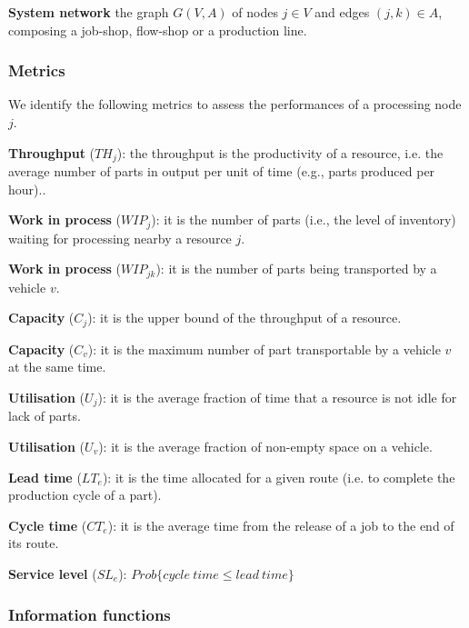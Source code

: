 \textbf{System network} the graph $G(V,A)$ of nodes $j\in V$ and edges $\left(j,k\right)\in A$, composing a job-shop, flow-shop or a production line.

\subsubsection{Metrics}
We identify the following metrics to assess the performances of a processing node $j$.\par

\textbf{Throughput} ($TH_{j}$): the throughput is the productivity of a resource, i.e. the average number of parts in output per unit of time (e.g., parts produced per hour)..\par

\textbf{Work in process} ($WIP_{j}$): it is the number of parts (i.e., the level of inventory) waiting for processing nearby a resource $j$.\par

\textbf{Work in process} ($WIP_{jk}$): it is the number of parts being transported by a vehicle $v$. \par

\textbf{Capacity} ($C_j$): it is the upper bound of the throughput of a resource.\par

\textbf{Capacity} ($C_v$): it is the maximum number of part transportable by a vehicle $v$ at the same time. \par

\textbf{Utilisation} ($U_j$): it is the average fraction of time that a resource is not idle for lack of parts. \par

\textbf{Utilisation} ($U_v$): it is the average fraction of non-empty space on a vehicle. \par

\textbf{Lead time} ($LT_e$): it is the time allocated for a given route (i.e. to complete the production cycle of a part). \par

\textbf{Cycle time} ($CT_e$): it is the average time from the release of a job to the end of its route. \par

\textbf{Service level} ($SL_e$): $Prob\{cycle\ time\le lead\ time\}$

\subsubsection{Information functions}

